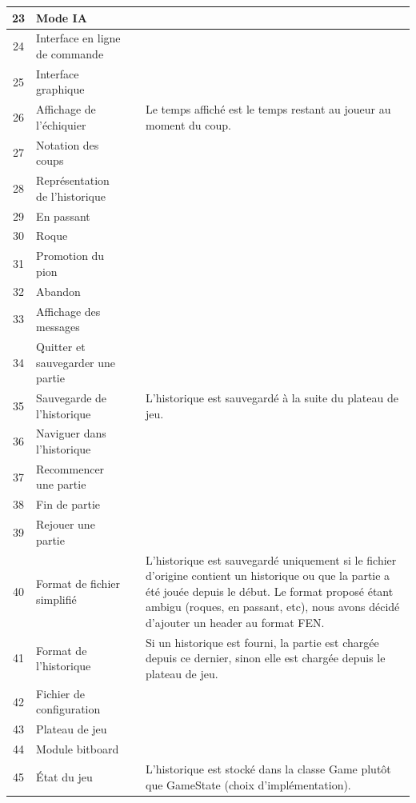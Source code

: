 \documentclass{article}
\newcommand{\valid}{\textcolor{green}{\ding{108}}}  %
\begin{document}
\begin{longtable}{|c|p{5cm}|c|p{5cm}|}
    \hline
    23 & Mode IA & \valid & \\
    \hline
    24 & Interface en ligne de commande & \valid & \\
    \hline
    25 & Interface graphique & \valid & \\
    \hline
    26 & Affichage de l'échiquier & \valid & Le temps affiché est le temps restant au joueur au moment du coup.\\
    \hline
    27 & Notation des coups & \valid & \\
    \hline
    28 & Représentation de l'historique & \valid & \\
    \hline
    29 & En passant & \valid & \\
    \hline
    30 & Roque & \valid & \\
    \hline
    31 & Promotion du pion & \valid & \\
    \hline
    32 & Abandon & \valid & \\
    \hline
    33 & Affichage des messages & \valid & \\
    \hline
    34 & Quitter et sauvegarder une partie & \valid & \\
    \hline
    35 & Sauvegarde de l’historique & \valid & L'historique est sauvegardé à la suite du plateau de jeu. \\
    \hline
    36 & Naviguer dans l'historique & \valid & \\
    \hline
    37 & Recommencer une partie & \valid & \\
    \hline
    38 & Fin de partie & \valid & \\
    \hline
    39 & Rejouer une partie & \valid & \\
    \hline
    40 & Format de fichier simplifié & \valid & L'historique est sauvegardé uniquement si le fichier d'origine contient un historique ou que la partie a été jouée depuis le début. Le format proposé étant ambigu (roques, en passant, etc), nous avons décidé d'ajouter un header au format FEN. \\
    \hline
    41 & Format de l'historique & \valid & Si un historique est fourni, la partie est chargée depuis ce dernier, sinon elle est chargée depuis le plateau de jeu. \\
    \hline
    42 & Fichier de configuration & \valid & \\
    \hline
    43 & Plateau de jeu & \valid & \\
    \hline
    44 & Module bitboard & \valid & \\
    \hline
    45 & État du jeu & \valid & L'historique est stocké dans la classe Game plutôt que GameState (choix d'implémentation).

\end{longtable}
\end{document}
